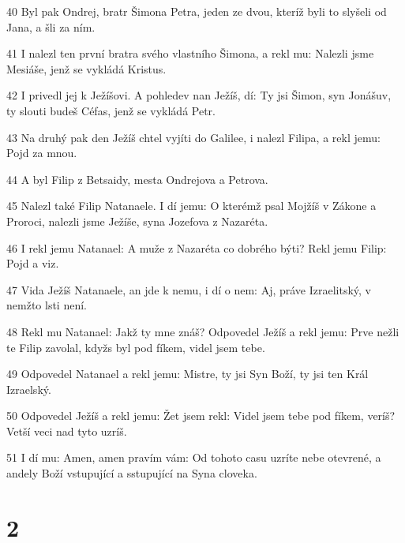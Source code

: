 \par 40 Byl pak Ondrej, bratr Šimona Petra, jeden ze dvou, kteríž byli to slyšeli od Jana, a šli za ním.
\par 41 I nalezl ten první bratra svého vlastního Šimona, a rekl mu: Nalezli jsme Mesiáše, jenž se vykládá Kristus.
\par 42 I privedl jej k Ježíšovi. A pohledev nan Ježíš, dí: Ty jsi Šimon, syn Jonášuv, ty slouti budeš Céfas, jenž se vykládá Petr.
\par 43 Na druhý pak den Ježíš chtel vyjíti do Galilee, i nalezl Filipa, a rekl jemu: Pojd za mnou.
\par 44 A byl Filip z Betsaidy, mesta Ondrejova a Petrova.
\par 45 Nalezl také Filip Natanaele. I dí jemu: O kterémž psal Mojžíš v Zákone a Proroci, nalezli jsme Ježíše, syna Jozefova z Nazaréta.
\par 46 I rekl jemu Natanael: A muže z Nazaréta co dobrého býti? Rekl jemu Filip: Pojd a viz.
\par 47 Vida Ježíš Natanaele, an jde k nemu, i dí o nem: Aj, práve Izraelitský, v nemžto lsti není.
\par 48 Rekl mu Natanael: Jakž ty mne znáš? Odpovedel Ježíš a rekl jemu: Prve nežli te Filip zavolal, kdyžs byl pod fíkem, videl jsem tebe.
\par 49 Odpovedel Natanael a rekl jemu: Mistre, ty jsi Syn Boží, ty jsi ten Král Izraelský.
\par 50 Odpovedel Ježíš a rekl jemu: Žet jsem rekl: Videl jsem tebe pod fíkem, veríš? Vetší veci nad tyto uzríš.
\par 51 I dí mu: Amen, amen pravím vám: Od tohoto casu uzríte nebe otevrené, a andely Boží vstupující a sstupující na Syna cloveka.

\chapter{2}

